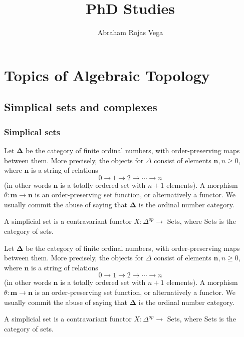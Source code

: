 \documentclass{book}
\title{PhD Studies}
\author{Abraham Rojas Vega}
\begin{document}
\maketitle

\tableofcontents
\part*{Topics of Algebraic Topology}




\chapter{Simplical sets and complexes}


\section{Simplical sets}

Let $\mathbf{\Delta}$ be the category of finite ordinal numbers, with order-preserving maps between them. More precisely, the objects for $\Delta$ consist of elements $\mathbf{n}, n \geq 0$, where $\mathbf{n}$ is a string of relations
$$
0 \rightarrow 1 \rightarrow 2 \rightarrow \cdots \rightarrow n
$$
(in other words $\mathbf{n}$ is a totally ordered set with $n+1$ elements). A morphism $\theta: \mathbf{m} \rightarrow \mathbf{n}$ is an order-preserving set function, or alternatively a functor. We usually commit the abuse of saying that $\mathbf{\Delta}$ is the ordinal number category.

A simplicial set is a contravariant functor $X: \Delta^{o p} \rightarrow$ Sets, where Sets is the category of sets.

\begin{example}
    Let $\boldsymbol{\Delta}$ be the category of finite ordinal numbers, with order-preserving maps between them. More precisely, the objects for $\Delta$ consist of elements $\mathbf{n}, n \geq 0$, where $\mathbf{n}$ is a string of relations
$$
0 \rightarrow 1 \rightarrow 2 \rightarrow \cdots \rightarrow n
$$
(in other words $\mathbf{n}$ is a totally ordered set with $n+1$ elements). A morphism $\theta: \mathbf{m} \rightarrow \mathbf{n}$ is an order-preserving set function, or alternatively a functor. We usually commit the abuse of saying that $\boldsymbol{\Delta}$ is the ordinal number category.

A simplicial set is a contravariant functor $X: \Delta^{o p} \rightarrow$ Sets, where Sets is the category of sets.
\end{example}
\end{document}
